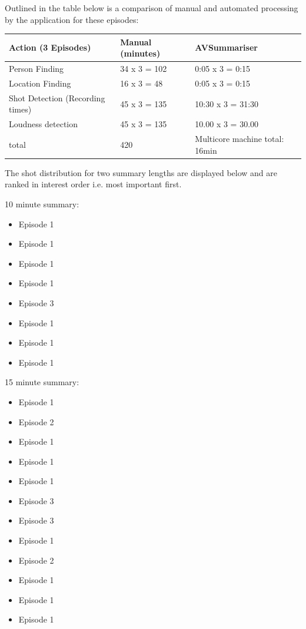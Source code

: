 Outlined in the table below is a comparison of manual and automated processing by the application for these episodes:

\begin{center}
\begin{tabular}{|p{150pt}|p{125pt}|p{125pt}|}
\hline
\textbf{Action (3 Episodes)}		&\textbf{Manual (minutes)}	&\textbf{AVSummariser}
\\\hline
Person Finding				&34 x 3 = 102		&0:05 x 3 = 0:15
\\\hline
Location Finding				&16 x 3 = 48		&0:05 x 3 = 0:15
\\\hline
Shot Detection (Recording times)	&45 x 3 = 135		&10:30 x 3 = 31:30
\\\hline
Loudness detection			&45 x 3 = 135		&10.00 x 3 = 30.00
\\\hline
total						&420				&Multicore machine total: 16min
\\\hline
\end{tabular}
\end{center}

The shot distribution for two summary lengths are displayed below and are ranked in interest order i.e. most important first.

10 minute summary:
\begin{itemize}
	\item{Episode 1}
	\item{Episode 1}
	\item{Episode 1}
	\item{Episode 1}
	\item{Episode 3}
	\item{Episode 1}
	\item{Episode 1}
	\item{Episode 1}
\end{itemize}

15 minute summary:
\begin{itemize}
	\item{Episode 1}
	\item{Episode 2}
	\item{Episode 1}
	\item{Episode 1}
	\item{Episode 1}
	\item{Episode 3}
	\item{Episode 3}
	\item{Episode 1}
	\item{Episode 2}
	\item{Episode 1}
	\item{Episode 1}
	\item{Episode 1}
\end{itemize}

